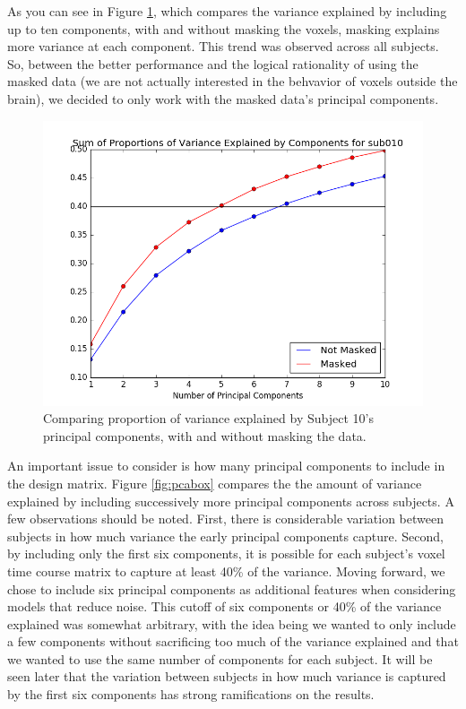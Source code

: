As you can see in Figure \ref{fig:pca10}, which compares the variance 
explained by including up to ten components, with and without masking the 
voxels, masking explains more variance at each component. This trend was 
observed across all subjects. So, between the better performance and the 
logical rationality of using the masked data (we are not actually interested 
in the behvavior of voxels outside the brain), we decided to only work with 
the masked data's principal components. 

\begin{figure}[ht]
	\centering
	\includegraphics[width=.5\linewidth]{../images/pcacumsumssub010.png}
 	\caption{Comparing proportion of variance explained by Subject 10's 
principal components, with and without masking the data.}
 	\label{fig:pca10}
\end{figure}

An important issue to consider is how many principal components to include in 
the design matrix. Figure \ref{fig:pcabox} compares the the amount of variance 
explained by including successively more principal components across subjects. 
A few observations should be noted. First, there is considerable variation 
between subjects in how much variance the early principal components capture. 
Second, by including only the first six components, it is possible for each 
subject's voxel time course matrix to capture at least 40\% of the variance. 
Moving forward, we chose to include six principal components as additional 
features when considering models that reduce noise. This cutoff of six 
components or 40\% of the variance explained was somewhat arbitrary, with the 
idea being we wanted to only include a few components without sacrificing too 
much of the variance explained and that we wanted to use the same number of 
components for each subject. It will be seen later that the variation between 
subjects in how much variance is captured by the first six components has strong 
ramifications on the results. 

